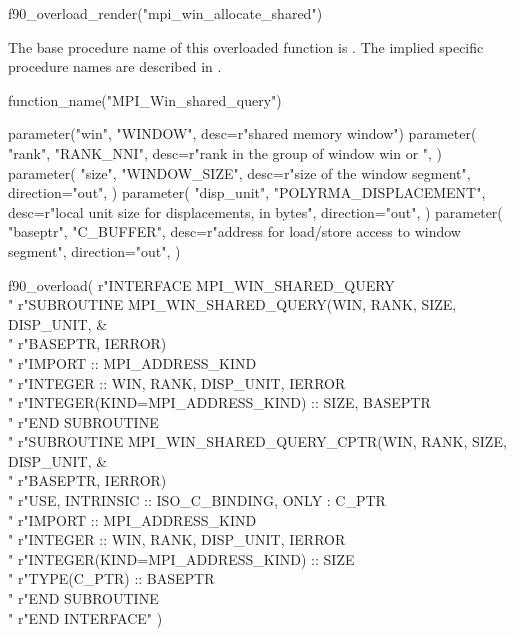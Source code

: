 \begin{mpi-binding}
    f90_overload_render("mpi_win_allocate_shared")
\end{mpi-binding}
 
The base procedure name of this overloaded function is\flushline %
. The implied specific procedure names
are described in .

\begin{mpi-binding}
    function_name("MPI_Win_shared_query")
    
    parameter("win", "WINDOW", desc=r"shared memory window")
    parameter(
        "rank",
        "RANK_NNI",
        desc=r"rank in the group of window win or ",
    )
    parameter(
        "size",
        "WINDOW_SIZE",
        desc=r"size of the window segment",
        direction="out",
    )
    parameter(
        "disp_unit",
        "POLYRMA_DISPLACEMENT",
        desc=r"local unit size for displacements, in bytes",
        direction="out",
    )
    parameter(
        "baseptr",
        "C_BUFFER",
        desc=r"address for load/store access to window segment",
        direction="out",
    )
    
    f90_overload(
        r"\>INTERFACE MPI\_WIN\_SHARED\_QUERY \\ "
        r"\>\>SUBROUTINE MPI\_WIN\_SHARED\_QUERY(WIN, RANK, SIZE, DISP\_UNIT, \&\\ "
        r"\>\>\>\>BASEPTR, IERROR) \\ "
        r"\>\>\>IMPORT :: MPI\_ADDRESS\_KIND \\ "
        r"\>\>\>INTEGER :: WIN, RANK, DISP\_UNIT, IERROR \\ "
        r"\>\>\>INTEGER(KIND=MPI\_ADDRESS\_KIND) :: SIZE, BASEPTR \\ "
        r"\>\>END SUBROUTINE \\ "
        r"\>\>SUBROUTINE MPI\_WIN\_SHARED\_QUERY\_CPTR(WIN, RANK, SIZE, DISP\_UNIT, \&\\ "
        r"\>\>\>\>BASEPTR, IERROR) \\ "
        r"\>\>\>USE, INTRINSIC :: ISO\_C\_BINDING, ONLY : C\_PTR \\ "
        r"\>\>\>IMPORT :: MPI\_ADDRESS\_KIND \\ "
        r"\>\>\>INTEGER :: WIN, RANK, DISP\_UNIT, IERROR \\ "
        r"\>\>\>INTEGER(KIND=MPI\_ADDRESS\_KIND) :: SIZE \\ "
        r"\>\>\>TYPE(C\_PTR) :: BASEPTR \\ "
        r"\>\>END SUBROUTINE \\ "
        r"\>END INTERFACE"
    )
\end{mpi-binding}

